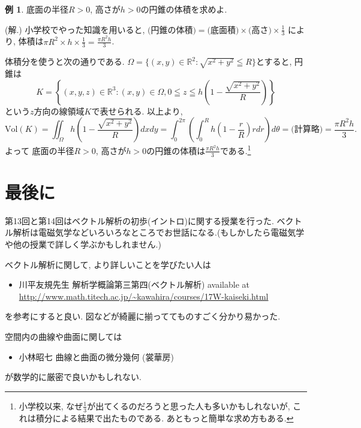 \documentclass[dvipdfmx,a4paper,11pt]{article}
\newcommand{\R}{\mathbb{R}}
\newcommand{\vol}{\text{Vol}}
\theoremstyle{definition}
\newtheorem{exa}[thm]{例}
\begin{document}
  \begin{exa}
  底面の半径$R>0$, 高さが$h>0$の円錐の体積を求めよ.
  
  \hspace{-11pt}(解.)
  小学校でやった知識を用いると, 
  $
  \text{(円錐の体積)} =  \text{(底面積)} \times \text{(高さ)} \times \frac{1}{3}
  $
  により, 体積は$\pi R^2 \times h \times \frac{1}{3} = \frac{\pi R^2 h}{3}$.
  
体積分を使うと次の通りである.
$\Omega= \{ (x,y) \in \R^2 : \sqrt{x^2+y^2} \leqq R\}$とすると, 円錐は
$$K=\left\{ (x,y,z) \in \R^3 : (x,y) \in \Omega, 0 \leqq z \leqq h \left(1- \frac{ \sqrt{x^2+y^2}}{R} \right) \right\}$$
という$z$方向の線領域$K$で表せられる.
以上より, 
$$
\vol(K)=
\iint_{\Omega} h \left(1- \frac{ \sqrt{x^2+y^2}}{R} \right)dxdy 
=
\int_{0}^{2\pi} \left(\int_{0}^{R}h \left(1- \frac{ r}{R} \right)rdr \right) d \theta
= \text{(計算略)}
=\frac{\pi R^2 h}{3}.
$$
よって 底面の半径$R>0$, 高さが$h>0$の円錐の体積は$\frac{\pi R^2 h}{3}$である.\footnote{小学校以来, なぜ$\frac{1}{3}$が出てくるのだろうと思った人も多いかもしれないが, これは積分による結果で出たものである. あともっと簡単な求め方もある.}
  \end{exa}



 \section{最後に}
第13回と第14回はベクトル解析の初歩(イントロ)に関する授業を行った. 
ベクトル解析は電磁気学などいろいろなところでお世話になる.(もしかしたら電磁気学や他の授業で詳しく学ぶかもしれません.)

ベクトル解析に関して, より詳しいことを学びたい人は
\begin{itemize}
\item 川平友規先生 解析学概論第三第四(ベクトル解析) available at \url{http://www.math.titech.ac.jp/~kawahira/courses/17W-kaiseki.html}
\end{itemize}
を参考にすると良い.
図などが綺麗に揃っててものすごく分かり易かった.

空間内の曲線や曲面に関しては
\begin{itemize}
\item 小林昭七 曲線と曲面の微分幾何 (裳華房)
\end{itemize}
が数学的に厳密で良いかもしれない.
\end{document}

